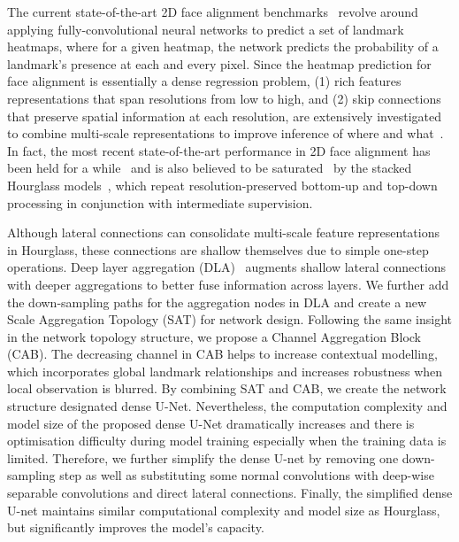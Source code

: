 \documentclass{bmvc2k}
\begin{document}
The current state-of-the-art 2D face alignment benchmarks~\cite{sagonas2016300,stefanos2017menpo} revolve around applying fully-convolutional neural networks to predict a set of landmark heatmaps, where for a given heatmap, the network predicts the probability of a landmark's presence at each and every pixel. Since the heatmap prediction for face alignment is essentially a dense regression problem, (1) rich features representations that span resolutions from low to high, and (2) skip connections that preserve spatial information at each resolution, are extensively investigated to combine multi-scale representations to improve inference of where and what~\cite{ronneberger2015u,lin2017feature,newell2016stacked,shrivastava2016beyond}. In fact, the most recent state-of-the-art performance in 2D face alignment has been held for a while~\cite{yang2017stacked,stefanos2017menpo} and is also believed to be saturated~\cite{bulat2017binarized,bulat2017far} by the stacked Hourglass models~\cite{newell2016stacked}, which repeat resolution-preserved bottom-up and top-down processing in conjunction with intermediate supervision.

Although lateral connections can consolidate multi-scale feature representations in Hourglass, these connections are shallow themselves due to simple one-step operations. Deep layer aggregation (DLA)~\cite{yu2017deep} augments shallow lateral connections with deeper aggregations to better fuse information across layers. We further add the down-sampling paths for the aggregation nodes in DLA and create a new Scale Aggregation Topology (SAT) for network design. Following the same insight in the network topology structure, we propose a Channel Aggregation Block (CAB). The decreasing channel in CAB helps to increase contextual modelling, which incorporates global landmark relationships and increases robustness when local observation is blurred. By combining SAT and CAB, we create the network structure designated dense U-Net. Nevertheless, the computation complexity and model size of the proposed dense U-Net dramatically increases and there is optimisation difficulty during model training especially when the training data is limited. Therefore, we further simplify the dense U-net by removing one down-sampling step as well as substituting some normal convolutions with deep-wise separable convolutions and direct lateral connections. Finally, the simplified dense U-net maintains similar computational complexity and model size as Hourglass, but significantly improves the model's capacity.
\end{document}
